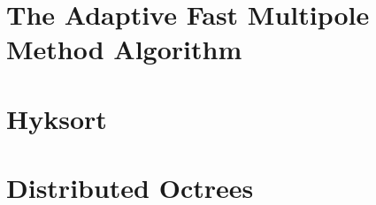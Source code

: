 \chapter{The Adaptive Fast Multipole Method Algorithm}\label{app:adaptive_fmm}


\chapter{Hyksort}\label{app:hyksort}


\chapter{Distributed Octrees}\label{app:morton}
